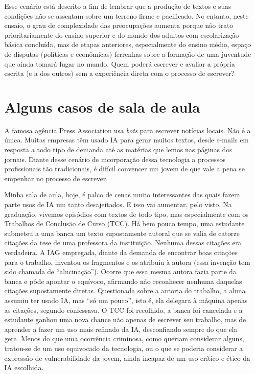 \documentclass[portuguese]{textolivre}
\begin{document}
Esse cenário está descrito a fim de lembrar que a produção de textos e suas condições não se assentam sobre um terreno firme e pacificado. No entanto, neste ensaio, o grau de complexidade das preocupações aumenta porque não trato prioritariamente do ensino superior e do mundo dos adultos com escolarização básica concluída, mas de etapas anteriores, especialmente do ensino médio, espaço de disputas (políticas e econômicas) ferrenhas sobre a formação de uma juventude que ainda tomará lugar no mundo. Quem poderá escrever e avaliar a própria escrita (e a dos outros) sem a experiência direta com o processo de escrever?

\section{Alguns casos de sala de aula}
A famosa agência Press Association usa \textit{bots} para escrever notícias locais. Não é a única. Muitas empresas têm usado IA para gerar muitos textos, desde e-mails em resposta a todo tipo de demanda até as matérias que lemos nas páginas dos jornais. Diante desse cenário de incorporação dessa tecnologia a processos profissionais tão tradicionais, é difícil convencer um jovem de que vale a pena se empenhar no processo de escrever.

Minha sala de aula, hoje, é palco de cenas muito interessantes das quais fazem parte usos de IA um tanto desajeitados. E isso vai aumentar, pelo visto. Na graduação, vivemos episódios com textos de todo tipo, mas especialmente com os Trabalhos de Conclusão de Curso (TCC). Há bem pouco tempo, uma estudante submeteu a uma banca um texto supostamente autoral que se valia de catorze citações da tese de uma professora da instituição. Nenhuma dessas citações era verdadeira. A IAG empregada, diante da demanda de encontrar boas citações para o trabalho, inventou os fragmentos e os atribuiu à autora (essa invenção tem sido chamada de ``alucinação''). Ocorre que essa mesma autora fazia parte da banca e pôde apontar o equívoco, afirmando não reconhecer nenhuma daquelas citações supostamente diretas. Questionada sobre a autoria do trabalho, a aluna assumiu ter usado IA, mas ``só um pouco'', isto é, ela delegara à máquina apenas as citações, segundo confessava. O TCC foi recolhido, a banca foi cancelada e a estudante ganhou uma nova chance não apenas de escrever seu trabalho, mas de aprender a fazer um uso mais refinado da IA, desconfiando sempre do que ela gera. Menos do que uma ocorrência criminosa, como queriam considerar alguns, tratou-se de um uso equivocado da tecnologia, ou o que se poderia considerar a expressão de vulnerabilidade da jovem, ainda incapaz de um uso crítico e ético da IA escolhida.
\end{document}
